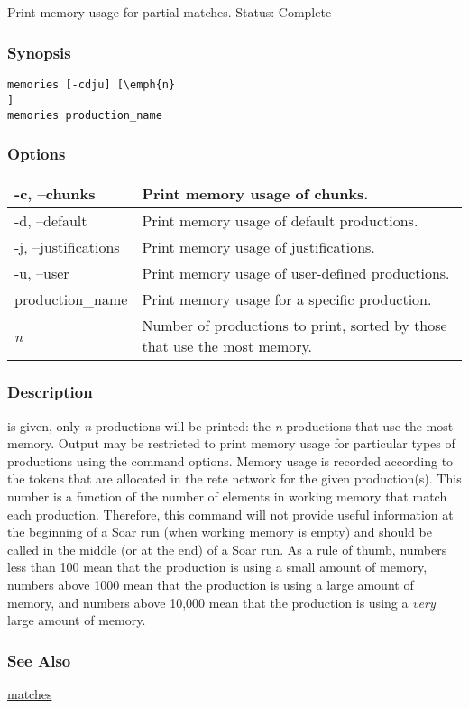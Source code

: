 \subsection{}
\label{memories}
Print memory usage for partial matches. 
 Status: Complete
\subsubsection*{Synopsis}
\begin{verbatim}
memories [-cdju] [\emph{n}
]
memories production_name 
\end{verbatim}
\subsubsection*{Options}
\begin{tabular}{|l|l|}
\hline 
 -c, --chunks  & Print memory usage of chunks.  \\
 \hline 
 -d, --default  & Print memory usage of default productions.  \\
 \hline 
 -j, --justifications  & Print memory usage of justifications.  \\
 \hline 
 -u, --user  & Print memory usage of user-defined productions.  \\
 \hline 
production\_name & Print memory usage for a specific production.  \\
 \hline 
\emph{n}
 & Number of productions to print, sorted by those that use the most memory.  \\
 \hline 
\end{tabular}
\subsubsection*{Description}
 is given, only \emph{n}
 productions will be printed: the \emph{n}
 productions that use the most memory. Output may be restricted to print memory usage for particular types of productions using the command options. 
 Memory usage is recorded according to the tokens that are allocated in the rete network for the given production(s). This number is a function of the number of elements in working memory that match each production. Therefore, this command will not provide useful information at the beginning of a Soar run (when working memory is empty) and should be called in the middle (or at the end) of a Soar run. 
 As a rule of thumb, numbers less than 100 mean that the production is using a small amount of memory, numbers above 1000 mean that the production is using a large amount of memory, and numbers above 10,000 mean that the production is using a \emph{very}
 large amount of memory. 
\subsubsection*{See Also}
\hyperref[matches]{matches} 